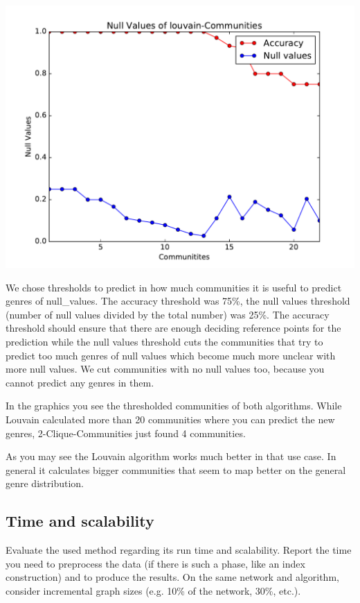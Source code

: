 \documentclass[11pt,a4paper,onecolumn,notitlepage]{article}
\begin{document}
\includegraphics[scale=0.4]{spotify_null_louvain.pdf}

We chose thresholds to predict in how much communities it is useful to predict genres of null_values. The accuracy threshold was 75\%, the null values threshold (number of null values divided by the total number) was 25\%. The accuracy threshold should ensure that there are enough deciding reference points for the prediction while the null values threshold cuts the communities that try to predict too much genres of null values which become much more unclear with more null values. We cut communities with no null values too, because you cannot predict any genres in them.

In the graphics you see the thresholded communities of both algorithms. While Louvain calculated more than 20 communities where you can predict the new genres, 2-Clique-Communities just found 4 communities.

As you may see the Louvain algorithm works much better in that use case. In general it calculates bigger communities that seem to map better on the general genre distribution. 


\subsection{Time and scalability}

Evaluate the used method regarding its run time and scalability. Report the time you need to preprocess  the data (if there is such a phase, like an index construction) and to produce the results. On the same network and algorithm, consider incremental graph sizes (e.g. 10\% of the network, 30\%, etc.). 
\end{document}
